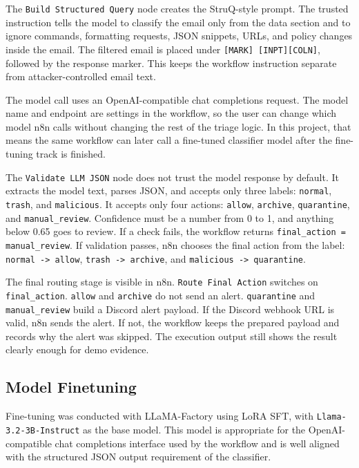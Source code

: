 \documentclass[11pt,a4paper]{article}
\begin{document}
The \texttt{Build Structured Query} node creates the StruQ-style prompt. The
trusted instruction tells the model to classify the email only from the data
section and to ignore commands, formatting requests, JSON snippets, URLs, and
policy changes inside the email. The filtered email is placed under
\texttt{[MARK] [INPT][COLN]}, followed by the response marker. This keeps the
workflow instruction separate from attacker-controlled email text.

The model call uses an OpenAI-compatible chat completions request. The model name
and endpoint are settings in the workflow, so the user can change which model n8n
calls without changing the rest of the triage logic. In this project, that means
the same workflow can later call a fine-tuned classifier model after the
fine-tuning track is finished.

The \texttt{Validate LLM JSON} node does not trust the model response by default.
It extracts the model text, parses JSON, and accepts only three labels:
\texttt{normal}, \texttt{trash}, and \texttt{malicious}. It accepts only four
actions: \texttt{allow}, \texttt{archive}, \texttt{quarantine}, and
\texttt{manual\_review}. Confidence must be a number from 0 to 1, and anything
below 0.65 goes to review. If a check fails, the workflow returns
\texttt{final\_action = manual\_review}. If validation passes, n8n chooses the
final action from the label: \texttt{normal -> allow},
\texttt{trash -> archive}, and \texttt{malicious -> quarantine}.

The final routing stage is visible in n8n. \texttt{Route Final Action} switches
on \texttt{final\_action}. \texttt{allow} and \texttt{archive} do not send an
alert. \texttt{quarantine} and \texttt{manual\_review} build a Discord alert
payload. If the Discord webhook URL is valid, n8n sends the alert. If not, the
workflow keeps the prepared payload and records why the alert was skipped. The
execution output still shows the result clearly enough for demo evidence.

\subsection{Model Finetuning}

Fine-tuning was conducted with LLaMA-Factory using LoRA SFT, with
\texttt{Llama-3.2-3B-Instruct} as the base model. This model is appropriate for
the OpenAI-compatible chat completions interface used by the workflow and is
well aligned with the structured JSON output requirement of the classifier.
\end{document}
